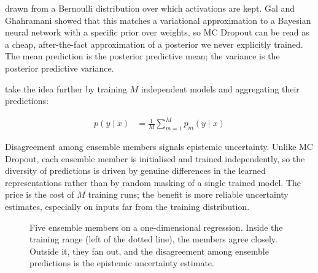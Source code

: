  drawn from a Bernoulli distribution over which activations are kept.
Gal and Ghahramani showed that this matches a variational approximation to a Bayesian neural network with a specific prior over weights, so MC Dropout can be read as a cheap, after-the-fact approximation of a posterior we never explicitly trained.
The mean prediction is the posterior predictive mean; the variance is the posterior predictive variance.

\cite{Lakshminarayanan2017} take the idea further by training $M$ independent models and aggregating their predictions:

\begin{align*}
    p(y \mid x) &= \tfrac{1}{M} \sum_{m=1}^{M} p_m(y \mid x)
\end{align*}

Disagreement among ensemble members signals epistemic uncertainty.
Unlike MC Dropout, each ensemble member is initialised and trained independently, so the diversity of predictions is driven by genuine differences in the learned representations rather than by random masking of a single trained model.
The price is the cost of $M$ training runs; the benefit is more reliable uncertainty estimates, especially on inputs far from the training distribution.

\begin{figure}
\centering
{}
\caption{Five ensemble members on a one-dimensional regression. Inside the training range (left of the dotted line), the members agree closely. Outside it, they fan out, and the disagreement among ensemble predictions is the epistemic uncertainty estimate.}
\label{fig:ensemble_disagreement}
\end{figure}

